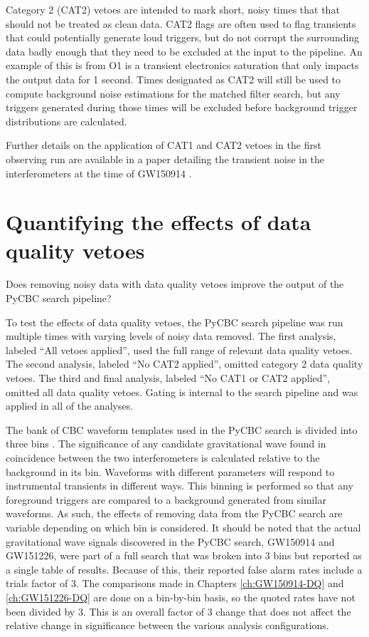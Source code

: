 Category 2 (CAT2) vetoes are intended to mark short, noisy times that
that should not be treated as clean data. CAT2 flags are often
used to flag transients that could potentially generate loud triggers, but do not
corrupt the surrounding data badly enough that they need to be excluded at the input to the pipeline.
An example of this is from O1 is a transient electronics saturation that only impacts the output
data for 1 second.  Times designated
as CAT2 will still be used to compute background noise estimations for the matched filter search,
but any triggers generated
during those times will be excluded before background trigger distributions are calculated.

Further details on the application of CAT1 and CAT2 vetoes in the first observing run
are available in a paper detailing the transient noise in the interferometers at the
time of GW150914 \cite{GW150914-DETCHAR}.

\section{Quantifying the effects of data quality vetoes}\label{sec:methodology}
Does removing noisy data with data quality vetoes improve the output of the PyCBC search pipeline?

To test the effects of data quality vetoes, the PyCBC search pipeline was run multiple times with
varying levels of noisy data removed. The first analysis, labeled
``All vetoes applied'', used the full range of relevant data quality vetoes. The second
analysis, labeled ``No CAT2 applied'', omitted category 2 data quality vetoes. The third and final
analysis, labeled ``No CAT1 or CAT2 applied'', omitted all data quality vetoes.
Gating is internal to the search pipeline and was applied in all of the analyses.

The bank of CBC waveform templates used in the PyCBC search is divided into three bins
\cite{GW150914-CBC}. The significance of any candidate gravitational wave found in
coincidence between the two interferometers is calculated relative to the background in its bin.
Waveforms with different parameters will respond to instrumental transients in different ways.
This binning is performed so that any foreground triggers are compared to a background
generated from similar waveforms.
As such, the effects of removing data from the PyCBC search are variable depending on
which bin is considered. It should be noted that the actual gravitational wave signals
discovered in the PyCBC search,
GW150914 and GW151226, were part of a full search that was broken into 3 bins but reported
as a single table of results. Because of this,
their reported false alarm rates include a trials factor of 3. The comparisons made in Chapters  
\ref{ch:GW150914-DQ} and \ref{ch:GW151226-DQ} are done on a bin-by-bin basis,
so the quoted rates have not been divided by 3. This is an overall factor of 3 change
that does not affect the relative change in significance between the various analysis
configurations.

